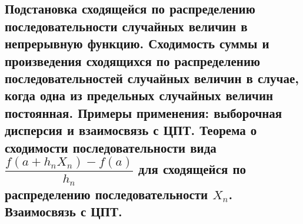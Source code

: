 \subsection{Подстановка сходящейся по распределению последовательности случайных величин в непрерывную функцию. Сходимость суммы и произведения сходящихся по распределению последовательностей случайных величин в случае, когда одна из предельных случайных величин постоянная. Примеры применения: выборочная дисперсия и взаимосвязь с ЦПТ. Теорема о сходимости последовательности вида $\dfrac{f(a + h_n X_n) - f(a)}{h_n}$ для сходящейся по распределению последовательности $X_n$. Взаимосвязь с ЦПТ.}